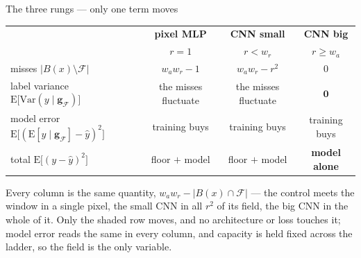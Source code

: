 \begin{frame}{The three rungs --- only one term moves}
  \vfill
  \begin{center}
  {\small
  \renewcommand{\arraystretch}{1.8}
  \setlength{\tabcolsep}{10pt}
  \begin{tabular}{@{}l c c c@{}}
    \toprule
      & \textbf{pixel MLP} & \textbf{CNN small} & \textbf{CNN big} \\
      & $r = 1$
      & $r < w_{r}$
      & $r \ge w_{a}$ \\
    \midrule
    misses $\big|B(x) \setminus \mathcal{F}\big|$
      & $w_{a}w_{r} - 1$
      & $w_{a}w_{r} - r^{2}$
      & $0$ \\
    \rowcolor{argA!22}
    label variance $\mathrm{E}\big[\mathrm{Var}(y \mid \mathbf{g}_{\mathcal{F}})\big]$
      & the misses fluctuate
      & the misses fluctuate
      & $\mathbf{0}$ \\
    model error $\mathrm{E}\big[(\mathrm{E}[y \mid \mathbf{g}_{\mathcal{F}}] - \hat y)^{2}\big]$
      & training buys
      & training buys
      & training buys \\
    \midrule
    total $\mathrm{E}\big[(y - \hat y)^{2}\big]$
      & floor $+$ model
      & floor $+$ model
      & \textbf{model alone} \\
    \bottomrule
  \end{tabular}}
  \end{center}
  \vspace{6pt}
  {\footnotesize\raggedright Every column is the same quantity,
   $w_{a}w_{r} - \big|B(x) \cap \mathcal{F}\big|$ --- the control meets the window in
   a single pixel, the small CNN in all $r^{2}$ of its field, the big CNN in the whole
   of it. Only the shaded row moves, and no architecture or loss touches it; model
   error reads the same in every column, and capacity is held fixed across the ladder,
   so the field is the only variable.
   \par}
  \vfill
\end{frame}

